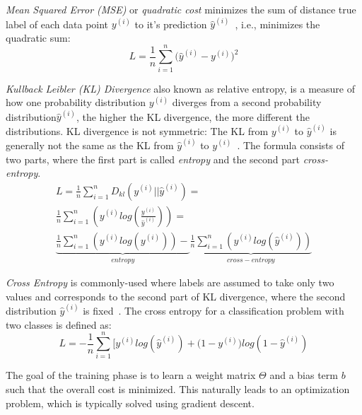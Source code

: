 \begin{inparaenum}
\item \emph{Mean Squared Error (MSE)} or \emph{quadratic cost} minimizes the sum of distance true label of each data point $y^{ (i) }$ to it's prediction $\hat { y } ^{ (i) }$~, i.e., minimizes the quadratic sum: 
\begin{equation}
L=\frac { 1 }{ n } \sum _{ i=1 }^{ n }{ (\hat { y } ^{ (i) }- } y^{ (i) })^{ 2 }
\end{equation}
\item \emph{Kullback Leibler (KL) Divergence} also known as relative entropy, is a measure of how one probability distribution $y^{ (i) }$ diverges from a second probability distribution$\hat { y } ^{ (i) }$, the higher the KL divergence, the more different the distributions. KL divergence is not symmetric: The KL from $y^{ (i) }$ to $\hat { y } ^{ (i) }$ is generally not the same as the KL from $\hat { y } ^{ (i) }$ to $y^{ (i) }$~. The formula consists of two parts, where the first part is called \emph{entropy} and the second part \emph{cross-entropy}.
\begin{equation}
\begin{split}
L=\frac { 1 }{ n } \sum _{ i=1 }^{ n }{ D_{ kl }(y^{ (i) }||\hat { y } ^{ (i) }) } =\\
 \frac { 1 }{ n } \sum _{ i=1 }^{ n }{ (y^{ (i) }log(\frac { y^{ (i) } }{ \hat { y } ^{ (i) } } )) } =\\
 \underbrace { \frac { 1 }{ n } \sum _{ i=1 }^{ n }{ (y^{ (i) }log(y^{ (i) })) } - }_{ entropy } \underbrace { \frac { 1 }{ n } \sum _{ i=1 }^{ n }{ (y^{ (i) }log(\hat { y } ^{ (i) })) }  }_{ cross-entropy } 
 \end{split}
\end{equation}
\item \emph{Cross Entropy} is commonly-used where labels are assumed to take only two values and corresponds to the second part of KL divergence, where the second distribution $\hat { y } ^{ (i) }$ is fixed~. The cross entropy for a classification problem with two classes is defined as:  
\begin{equation}
L=-\frac { 1 }{ n } \sum _{ i=1 }^{ n }{ [y^{ (i) }log(\hat { y } ^{ (i) })+(1- } y^{ (i) })log(1-\hat { y } ^{ (i) })
\end{equation}
\end{inparaenum}
The goal of the training phase is to learn a weight matrix $\Theta$ and a bias term $b$ such that the overall cost is minimized. This naturally leads to an optimization problem, which is  typically solved using gradient descent.\\
